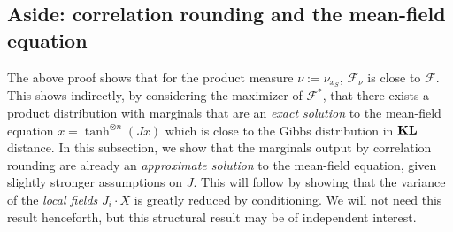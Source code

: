 \documentclass[11pt, oneside, english]{article}
\newcommand{\F}{\mathcal{F}}
\newcommand{\KL}{\mathop{\bf KL\/}}
\theoremstyle{definition}
\theoremstyle{plain}
\begin{document}
\subsection{Aside: correlation rounding and the mean-field equation}
\label{s:local-fields}
The above proof shows that for the product measure $\nu:=\nu_{x_S}$, $\F_\nu$ is close to $\F$. This shows indirectly, by considering the maximizer of $\F^*$, that there exists a product distribution with marginals that are an \emph{exact solution} to the mean-field equation $x = \tanh^{\otimes n}(J x)$ which is close to the Gibbs distribution in $\KL$ distance.
In this subsection, we show that the marginals output by correlation rounding are already an \emph{approximate solution} to the mean-field equation, given slightly stronger assumptions on $J$. This will follow by showing that the variance of the \emph{local fields} $J_i \cdot X$ is greatly reduced by conditioning. We will not need this result henceforth, but this structural result may be of independent interest.
\end{document}
